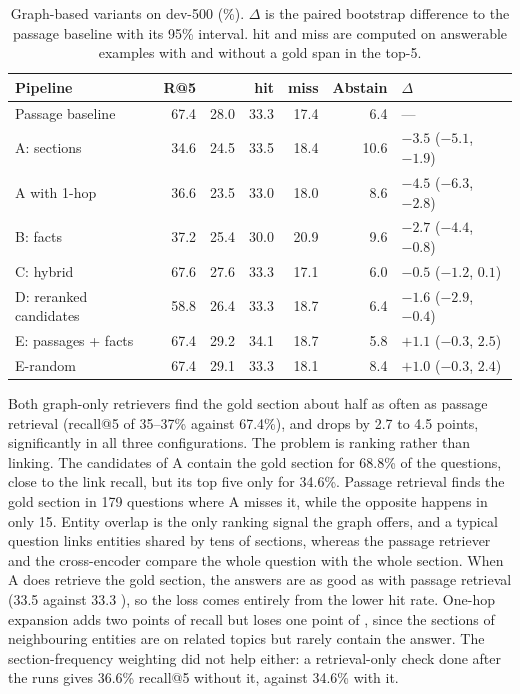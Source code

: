 \begin{table}[ht]
    \centering
    \caption{Graph-based variants on dev-500 (\%). $\Delta$\fone{} is the paired bootstrap
    difference to the passage baseline with its 95\% interval. \fone{} hit and miss are
    computed on answerable examples with and without a gold span in the top-5.}
    \label{tab:kgret:qa}
    \small
    \begin{tabular}{lrrrrrl}
        \toprule
        Pipeline & R@5 & \fone{} & \fone{} hit & \fone{} miss & Abstain & $\Delta$\fone{} \\
        \midrule
        Passage baseline       & 67.4 & 28.0 & 33.3 & 17.4 & 6.4 & --- \\
        A: sections            & 34.6 & 24.5 & 33.5 & 18.4 & 10.6 & $-3.5$ ($-5.1$, $-1.9$) \\
        A with 1-hop           & 36.6 & 23.5 & 33.0 & 18.0 &  8.6 & $-4.5$ ($-6.3$, $-2.8$) \\
        B: facts               & 37.2 & 25.4 & 30.0 & 20.9 &  9.6 & $-2.7$ ($-4.4$, $-0.8$) \\
        C: hybrid              & 67.6 & 27.6 & 33.3 & 17.1 &  6.0 & $-0.5$ ($-1.2$, $0.1$) \\
        D: reranked candidates & 58.8 & 26.4 & 33.3 & 18.7 &  6.4 & $-1.6$ ($-2.9$, $-0.4$) \\
        E: passages + facts    & 67.4 & 29.2 & 34.1 & 18.7 &  5.8 & $+1.1$ ($-0.3$, $2.5$) \\
        E-random               & 67.4 & 29.1 & 33.3 & 18.1 &  8.4 & $+1.0$ ($-0.3$, $2.4$) \\
        \bottomrule
    \end{tabular}
\end{table}

Both graph-only retrievers find the gold section about half as often as passage
retrieval (recall@5 of 35--37\% against 67.4\%), and \fone{} drops by 2.7 to 4.5 points,
significantly in all three configurations. The problem is ranking rather than linking.
The candidates of A contain the gold section for 68.8\% of the questions, close to the
link recall, but its top five only for 34.6\%. Passage retrieval finds the gold section
in 179 questions where A misses it, while the opposite happens in only 15. Entity
overlap is the only ranking signal the graph offers, and a typical question links
entities shared by tens of sections, whereas the passage retriever and the
cross-encoder compare the whole question with the whole section. When A does retrieve
the gold section, the answers are as good as with passage retrieval (33.5 against 33.3
\fone{}), so the loss comes entirely from the lower hit rate. One-hop expansion adds two
points of recall but loses one point of \fone{}, since the sections of neighbouring
entities are on related topics but rarely contain the answer. The section-frequency
weighting did not help either: a retrieval-only check done after the runs gives 36.6\%
recall@5 without it, against 34.6\% with it.

